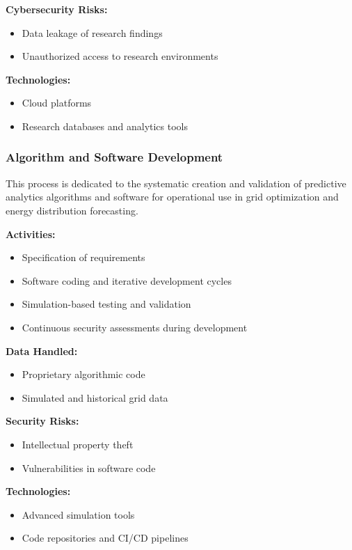 \textbf{Cybersecurity Risks:}
\begin{itemize}
    \item Data leakage of research findings
    \item Unauthorized access to research environments
\end{itemize}

\textbf{Technologies:}
\begin{itemize}
    \item Cloud platforms
    \item Research databases and analytics tools
\end{itemize}

\subsubsection{Algorithm and Software Development}

This process is dedicated to the systematic creation and validation of predictive analytics algorithms and software for operational use in grid optimization and energy distribution forecasting.

\textbf{Activities:}
\begin{itemize}
    \item Specification of requirements
    \item Software coding and iterative development cycles
    \item Simulation-based testing and validation
    \item Continuous security assessments during development
\end{itemize}

\textbf{Data Handled:}
\begin{itemize}
    \item Proprietary algorithmic code
    \item Simulated and historical grid data
\end{itemize}

\textbf{Security Risks:}
\begin{itemize}
    \item Intellectual property theft
    \item Vulnerabilities in software code
\end{itemize}

\textbf{Technologies:}
\begin{itemize}
    \item Advanced simulation tools
    \item Code repositories and CI/CD pipelines
\end{itemize}


